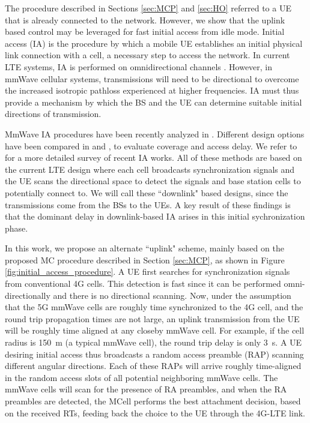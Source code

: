 \documentclass[conference,a4paper]{IEEEtran}
\begin{document}
The  procedure described in Sections \ref{sec:MCP} and \ref{sec:HO} referred to a UE that is already connected to the network.
However, we show that the uplink based control may be leveraged for fast initial access
from idle mode.
Initial access (IA) is the procedure by which a mobile UE establishes an initial 
physical link connection with a cell, a necessary step to access the network.
In current LTE systems, IA is performed on omnidirectional channels \cite{LTE_book}. 
However, in mmWave cellular systems, transmissions will need to be directional 
to overcome the increased isotropic pathloss experienced at higher frequencies.
IA must thus 
provide a mechanism by which the BS and the UE can determine suitable initial directions of transmission.




MmWave IA  procedures have been recently analyzed in \cite{Barati,barati2015initial,Capone,alk}. 
Different design options have been compared in \cite{CISS} and \cite{magazine_IA}, to evaluate coverage and access delay. We refer to \cite{magazine_IA} for a more detailed survey of recent IA works.
All of these methods are based on the current LTE design where each cell broadcasts
synchronization signals and the UE scans the directional space to detect the signals
and base station cells to potentially connect to.
We will call these ``downlink" based designs, since the transmissions come from the 
BSs to the UEs.
A key result of these findings is that the dominant delay in downlink-based IA arises in this initial 
sychronization phase.


In this work, we propose an alternate ``uplink"  scheme, mainly based on the proposed MC procedure described in Section \ref{sec:MCP},
as shown in Figure \ref{fig:initial_access_procedure}.  A UE first searches for
synchronization signals from conventional 4G cells.  This detection is fast since it 
can be performed omni-directionally and there is no directional scanning.  
Now, under the assumption that the
5G mmWave cells are roughly time synchronized to the 4G cell, and the round trip propagation times
are not large, an uplink transmission from the UE will be roughly time aligned at any 
closeby mmWave cell.  For example, if the cell radius is 150~m (a typical mmWave cell),
the round trip delay is only 3~s.  A UE desiring initial access
thus broadcasts a random access preamble (RAP) scanning different angular directions.
Each of these RAPs will arrive roughly time-aligned in the random access slots of
all potential neighboring mmWave cells.  The mmWave cells will scan for the presence  of RA preambles, and when the RA preambles are detected, the MCell  performs the best attachment decision, based on the received RTs, feeding back the choice to the UE through the 4G-LTE link.
\end{document}
